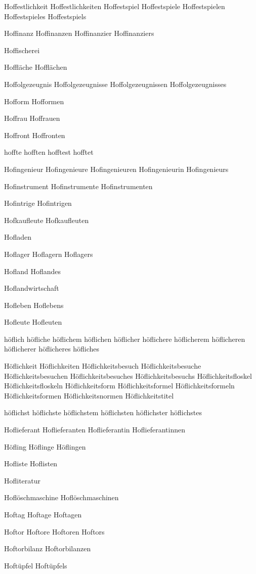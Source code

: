 Hoffestlichkeit
Hoffestlichkeiten
Hoffestspiel
Hoffestspiele
Hoffestspielen
Hoffestspieles
Hoffestspiels

Hoffinanz
Hoffinanzen
Hoffinanzier
Hoffinanziers

Hoffischerei

Hoffläche
Hofflächen

Hoffolgezeugnis
Hoffolgezeugnisse
Hoffolgezeugnissen
Hoffolgezeugnisses

Hofform
Hofformen

Hoffrau
Hoffrauen

Hoffront
Hoffronten

hoffte
hofften
hofftest
hofftet

Hofingenieur
Hofingenieure
Hofingenieuren
Hofingenieurin
Hofingenieurs

Hofinstrument
Hofinstrumente
Hofinstrumenten

Hofintrige
Hofintrigen

Hofkaufleute
Hofkaufleuten

Hofladen

Hoflager
Hoflagern
Hoflagers

Hofland
Hoflandes

Hoflandwirtschaft

Hofleben
Hoflebens

Hofleute
Hofleuten

höflich
höfliche
höflichem
höflichen
höflicher
höflichere
höflicherem
höflicheren
höflicherer
höflicheres
höfliches

Höflichkeit
Höflichkeiten
Höflichkeitsbesuch
Höflichkeitsbesuche
Höflichkeitsbesuchen
Höflichkeitsbesuches
Höflichkeitsbesuchs
Höflichkeitsfloskel
Höflichkeitsfloskeln
Höflichkeitsform
Höflichkeitsformel
Höflichkeitsformeln
Höflichkeitsformen
Höflichkeitsnormen
Höflichkeitstitel

höflichst
höflichste
höflichstem
höflichsten
höflichster
höflichstes

Hoflieferant
Hoflieferanten
Hoflieferantin
Hoflieferantinnen

Höfling
Höflinge
Höflingen

Hofliste
Hoflisten

Hofliteratur

Hoflöschmaschine
Hoflöschmaschinen

Hoftag
Hoftage
Hoftagen

Hoftor
Hoftore
Hoftoren
Hoftors

Hoftorbilanz
Hoftorbilanzen

Hoftüpfel
Hoftüpfels

